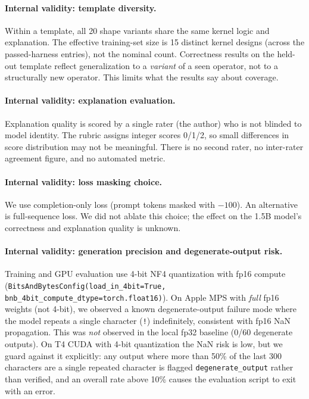 \documentclass[11pt]{article}
\newcommand{\code}[1]{\texttt{#1}}
\begin{document}
\paragraph{Internal validity: template diversity.}
Within a template, all 20 shape variants share the same kernel logic and explanation. The effective
training-set size is 15 distinct kernel designs (across the passed-harness entries), not the nominal
count. Correctness results on the held-out template reflect generalization to a \emph{variant} of a
seen operator, not to a structurally new operator. This limits what the results say about coverage.

\paragraph{Internal validity: explanation evaluation.}
Explanation quality is scored by a single rater (the author) who is not blinded to model identity.
The rubric assigns integer scores 0/1/2, so small differences in score distribution may not be
meaningful. There is no second rater, no inter-rater agreement figure, and no automated metric.

\paragraph{Internal validity: loss masking choice.}
We use completion-only loss (prompt tokens masked with $-100$). An alternative is full-sequence
loss. We did not ablate this choice; the effect on the 1.5B model's correctness and explanation
quality is unknown.

\paragraph{Internal validity: generation precision and degenerate-output risk.}
Training and GPU evaluation use 4-bit NF4 quantization with fp16 compute
(\code{BitsAndBytesConfig(load\_in\_4bit=True, bnb\_4bit\_compute\_dtype=torch.float16)}).
On Apple MPS with \emph{full} fp16 weights (not 4-bit), we observed a known degenerate-output
failure mode where the model repeats a single character (\texttt{!}) indefinitely, consistent
with fp16 NaN propagation. This was \emph{not} observed in the local fp32 baseline (0/60
degenerate outputs). On T4 CUDA with 4-bit quantization the NaN risk is low, but we guard against
it explicitly: any output where more than 50\% of the last 300 characters are a single repeated
character is flagged \code{degenerate\_output} rather than verified, and an overall rate above
10\% causes the evaluation script to exit with an error.
\end{document}
